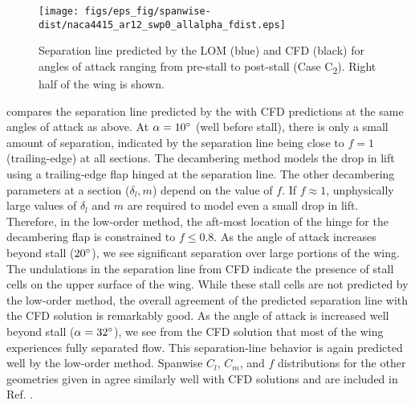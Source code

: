 \begin{figure}
    \centering
    \texttt{[image: figs/eps\_fig/spanwise-dist/naca4415\_ar12\_swp0\_allalpha\_fdist.eps]}
    \caption{Separation line predicted by the LOM (blue) and CFD (black) for angles of attack ranging from pre-stall to post-stall (Case C\textsubscript{2}). Right half of the wing is shown.}
    \label{fig:naca4415_ar12_swp0_allalpha_fdist}
\end{figure}

 compares the separation line predicted by the \methodabbr with CFD predictions at the same angles of attack as above. At $\alpha=10^\circ{}$ (well before stall), there is only a small amount of separation, indicated by the separation line being close to $f=1$ (trailing-edge) at all sections. The decambering method models the drop in lift using a trailing-edge flap hinged at the separation line. The other decambering parameters at a section ($\delta_l, m$) depend on the value of $f$. If $f \approx 1$, unphysically large values of $\delta_l$ and $m$ are required to model even a small drop in lift. Therefore, in the low-order method, the aft-most location of the hinge for the decambering flap is constrained to $f \leq 0.8$. As the angle of attack increases beyond stall ($20^\circ{}$), we see significant separation over large portions of the wing. The undulations in the separation line from CFD indicate the presence of stall cells on the upper surface of the wing. While these stall cells are not predicted by the low-order method, the overall agreement of the predicted separation line with the CFD solution is remarkably good. As the angle of attack is increased well beyond stall ($\alpha=32^\circ{}$), we see from the CFD solution that most of the wing experiences fully separated flow. This separation-line behavior is again predicted well by the low-order method. %
%
Spanwise $C_l$, $C_m$, and $f$ distributions for the other geometries given in  agree similarly well with CFD solutions and are included in Ref. \cite{PranavThesis}.

